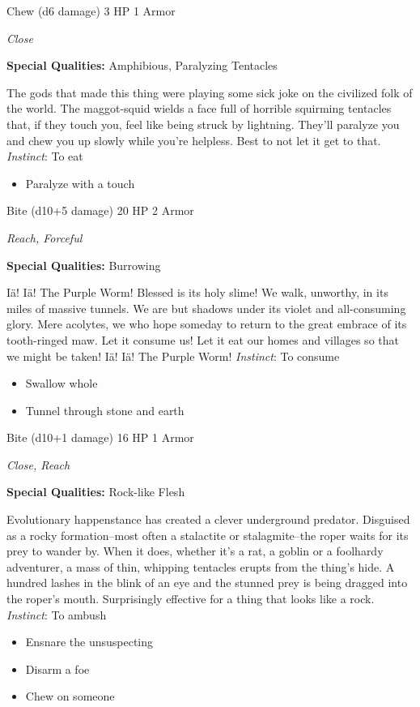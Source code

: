 \HRule
{}

Chew (d6 damage) \hspace*{\fill}3 HP 1 Armor

\emph{Close}

\textbf{Special Qualities:}
Amphibious, Paralyzing Tentacles

\HRule
The gods that made this thing were playing some sick joke on the civilized folk of the world. The maggot-squid wields a face full of horrible squirming tentacles that, if they touch you, feel like being struck by lightning. They'll paralyze you and chew you up slowly while you're helpless. Best to not let it get to that. \emph{Instinct}: To eat
\begin{itemize}
\item Paralyze with a touch
\end{itemize}

\newpage
\HRule
{}

Bite (d10+5 damage) \hspace*{\fill}20 HP 2 Armor

\emph{Reach, Forceful}

\textbf{Special Qualities:}
Burrowing

\HRule
I\"{a}! I\"{a}! The Purple Worm! Blessed is its holy slime! We walk, unworthy, in its miles of massive tunnels. We are but shadows under its violet and all-consuming glory. Mere acolytes, we who hope someday to return to the great embrace of its tooth-ringed maw. Let it consume us! Let it eat our homes and villages so that we might be taken! I\"{a}! I\"{a}! The Purple Worm! \emph{Instinct}: To consume
\begin{itemize}
\item Swallow whole
\item Tunnel through stone and earth
\end{itemize}

\HRule
{}

Bite (d10+1 damage) \hspace*{\fill}16 HP 1 Armor

\emph{Close, Reach}

\textbf{Special Qualities:}
Rock-like Flesh

\HRule
Evolutionary happenstance has created a clever underground predator. Disguised as a rocky formation--most often a stalactite or stalagmite--the roper waits for its prey to wander by. When it does, whether it's a rat, a goblin or a foolhardy adventurer, a mass of thin, whipping tentacles erupts from the thing's hide. A hundred lashes in the blink of an eye and the stunned prey is being dragged into the roper's mouth. Surprisingly effective for a thing that looks like a rock. \emph{Instinct}: To ambush
\begin{itemize}
\item Ensnare the unsuspecting
\item Disarm a foe
\item Chew on someone
\end{itemize}

